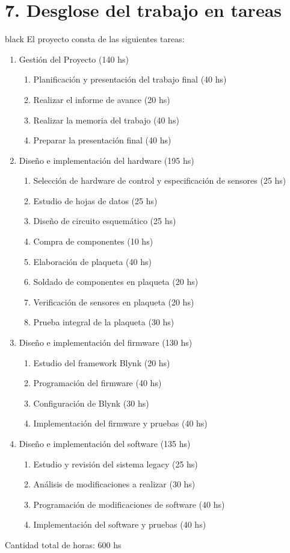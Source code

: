 \documentclass[
11pt, %
]{charter}
\begin{document}
\section{7. Desglose del trabajo en tareas}
\label{sec:wbs}

\begin{consigna}{black}
El proyecto consta de las siguientes tareas:

\begin{enumerate}
\item Gestión del Proyecto (140 hs)
	\begin{enumerate}
	\item Planificación y presentación del trabajo final (40 hs)
	\item Realizar el informe de avance (20 hs)
	\item Realizar la memoria del trabajo (40 hs)
	\item Preparar la presentación final (40 hs)
	\end{enumerate}
\item Diseño e implementación del hardware (195 hs)
	\begin{enumerate}
	\item Selección de hardware de control y especificación de sensores (25 hs)
	\item Estudio de hojas de datos (25 hs)
	\item Diseño de circuito esquemático (25 hs)
	\item Compra de componentes (10 hs)
	\item Elaboración de plaqueta (40 hs)
	\item Soldado de componentes en plaqueta (20 hs)
	\item Verificación de sensores en plaqueta (20 hs)
	\item Prueba integral de la plaqueta (30 hs)
	\end{enumerate}
\item Diseño e implementación del firmware (130 hs)
	\begin{enumerate}
	\item Estudio del framework Blynk (20 hs)
	\item Programación del firmware (40 hs)
	\item Configuración de Blynk (30 hs)
	\item Implementación del firmware y pruebas (40 hs)
	\end{enumerate}
\item Diseño e implementación del software (135 hs)
	\begin{enumerate}
	\item Estudio y revisión del sistema legacy (25 hs)
	\item Análisis de modificaciones a realizar (30 hs)
	\item Programación de modificaciones de software (40 hs)
	\item Implementación del software y pruebas (40 hs)
	\end{enumerate}
\end{enumerate}

Cantidad total de horas: 600 hs

\end{consigna}
\end{document}
